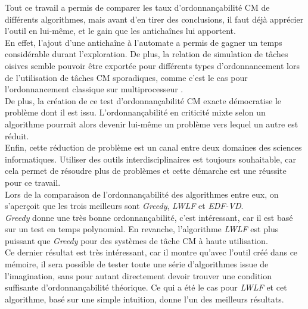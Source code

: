 \documentclass[12pt,a4paper,oneside]{book}
\theoremstyle{break}
\theoremstyle{breakplain}
\begin{document}
Tout ce travail a permis de comparer les taux d'ordonnançabilité CM de différents algorithmes, mais avant d'en tirer des conclusions, il faut déjà apprécier l'outil en lui-même, et le gain que les antichaînes lui apportent.\\

En effet, l'ajout d'une antichaîne à l'automate a permis de gagner un temps considérable durant l'exploration. De plus, la relation de simulation de tâches oisives semble pouvoir être exportée pour différents types d'ordonnancement lors de l'utilisation de tâches CM sporadiques, comme c'est le cas pour l'ordonnancement classique sur multiprocesseur \cite{geeraerts2013multiprocessor}.\\

De plus, la création de ce test d'ordonnançabilité CM exacte démocratise le problème dont il est issu. L'ordonnançabilité en criticité mixte selon un algorithme pourrait alors devenir lui-même un problème vers lequel un autre est réduit.\\

Enfin, cette réduction de problème est un canal entre deux domaines des sciences informatiques. Utiliser des outils interdisciplinaires est toujours souhaitable, car cela permet de résoudre plus de problèmes et cette démarche est une réussite pour ce travail.\\

Lors de la comparaison de l'ordonnançabilité des algorithmes entre eux, on s'aperçoit que les trois meilleurs sont \textit{Greedy}, \textit{LWLF} et \textit{EDF-VD}.\\
\textit{Greedy} donne une très bonne ordonnançabilité, c'est intéressant, car il est basé sur un test en temps polynomial. En revanche, l'algorithme \textit{LWLF} est plus puissant que \textit{Greedy} pour des systèmes de tâche CM à haute utilisation.\\

Ce dernier résultat est très intéressant, car il montre qu'avec l'outil créé dans ce mémoire, il sera possible de tester toute une série d'algorithmes issue de l'imagination, sans pour autant directement devoir trouver une condition suffisante d'ordonnançabilité théorique. Ce qui a été le cas pour \textit{LWLF} et cet algorithme, basé sur une simple intuition, donne l'un des meilleurs résultats.\\
\end{document}
